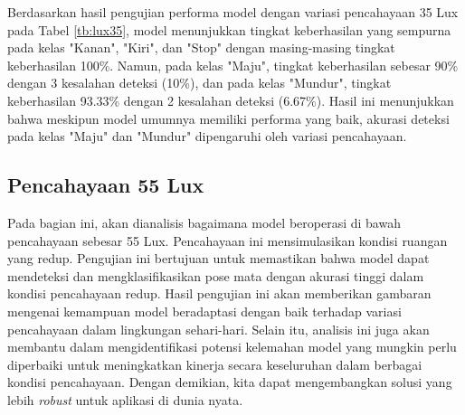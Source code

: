 Berdasarkan hasil pengujian performa model dengan variasi pencahayaan 35 Lux pada Tabel \ref{tb:lux35}, model menunjukkan tingkat keberhasilan yang sempurna pada kelas "Kanan", "Kiri", dan "Stop" dengan masing-masing tingkat keberhasilan 100\%. Namun, pada kelas "Maju", tingkat keberhasilan sebesar 90\% dengan 3 kesalahan deteksi (10\%), dan pada kelas "Mundur", tingkat keberhasilan 93.33\% dengan 2 kesalahan deteksi (6.67\%). Hasil ini menunjukkan bahwa meskipun model umumnya memiliki performa yang baik, akurasi deteksi pada kelas "Maju" dan "Mundur" dipengaruhi oleh variasi pencahayaan.

\subsection{Pencahayaan 55 Lux}

Pada bagian ini, akan dianalisis bagaimana model beroperasi di bawah pencahayaan sebesar 55 Lux. Pencahayaan ini mensimulasikan kondisi ruangan yang redup. Pengujian ini bertujuan untuk memastikan bahwa model dapat mendeteksi dan mengklasifikasikan pose mata dengan akurasi tinggi dalam kondisi pencahayaan redup. Hasil pengujian ini akan memberikan gambaran mengenai kemampuan model beradaptasi dengan baik terhadap variasi pencahayaan dalam lingkungan sehari-hari. Selain itu, analisis ini juga akan membantu dalam mengidentifikasi potensi kelemahan model yang mungkin perlu diperbaiki untuk meningkatkan kinerja secara keseluruhan dalam berbagai kondisi pencahayaan. Dengan demikian, kita dapat mengembangkan solusi yang lebih \emph{robust} untuk aplikasi di dunia nyata.

